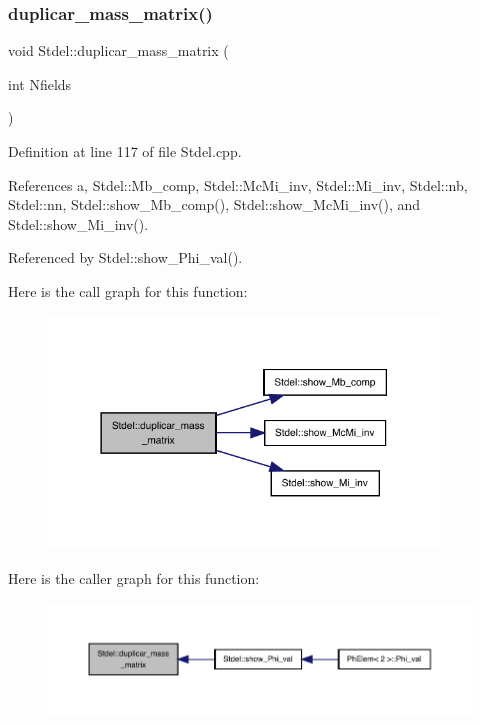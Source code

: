 \subsubsection{\texorpdfstring{duplicar\+\_\+mass\+\_\+matrix()}{duplicar\_mass\_matrix()}}
{\footnotesize\ttfamily void Stdel\+::duplicar\+\_\+mass\+\_\+matrix (\begin{DoxyParamCaption}\item[{int}]{Nfields }\end{DoxyParamCaption})\hspace{0.3cm}{\ttfamily [inherited]}}



Definition at line 117 of file Stdel.\+cpp.



References a, Stdel\+::\+Mb\+\_\+comp, Stdel\+::\+Mc\+Mi\+\_\+inv, Stdel\+::\+Mi\+\_\+inv, Stdel\+::nb, Stdel\+::nn, Stdel\+::show\+\_\+\+Mb\+\_\+comp(), Stdel\+::show\+\_\+\+Mc\+Mi\+\_\+inv(), and Stdel\+::show\+\_\+\+Mi\+\_\+inv().



Referenced by Stdel\+::show\+\_\+\+Phi\+\_\+val().

Here is the call graph for this function\+:
\nopagebreak
\begin{figure}[H]
\begin{center}
\leavevmode
\includegraphics[width=294pt]{classStdel_a922b779be1f8f12b7a5535ab529bff64_cgraph}
\end{center}
\end{figure}
Here is the caller graph for this function\+:
\nopagebreak
\begin{figure}[H]
\begin{center}
\leavevmode
\includegraphics[width=350pt]{classStdel_a922b779be1f8f12b7a5535ab529bff64_icgraph}
\end{center}
\end{figure}
\mbox{\label{classTetrahedral_a0b01268d3cfcab8cb07ab3ed9d21c111}} 
